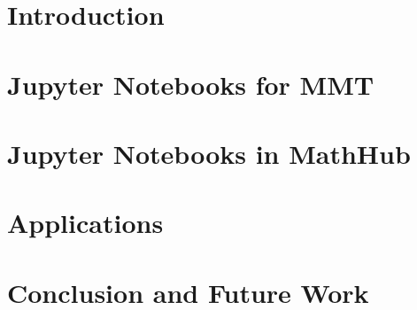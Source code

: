 \documentclass{llncs}
\author{Kai Amann, Michael Kohlhase, Florian Rabe, Tom Wiesing}
\institute{Computer Science, FAU Erlangen-N\"urnberg}
\begin{document}
\maketitle
\begin{abstract}\strut\\\end{abstract}

\setcounter{tocdepth}{2}
\newpage
\tableofcontents
\clearpage

\section{Introduction}\label{sec:intro}
\newpage

\section{Jupyter Notebooks for MMT}\label{sec:mmt-jp}
\newpage

\section{Jupyter Notebooks in MathHub}\label{sec:nb-mh}
\newpage

\section{Applications}\label{sec:mitm-nb}
\newpage

\section{Conclusion and Future Work}\label{sec:concl}
\newpage

\printbibliography
\end{document}

